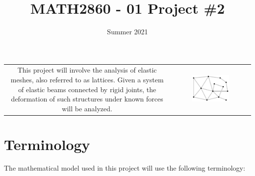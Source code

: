 \documentclass{article}
\title{MATH2860 - 01 Project \#2}
\date{Summer 2021}
\begin{document}
\maketitle

\begin{center}
\begin{tabular}{cc}
\parbox{0.5\textwidth}{
This project will involve the analysis of elastic meshes, also referred to as lattices. Given a system of elastic beams connected by rigid joints, the deformation of such structures under known forces will be analyzed. 
} & \parbox{0.5\textwidth}{
\includegraphics[width = 0.5\textwidth]{elastic_mesh_example}
}
\end{tabular}
\end{center}



\section{Terminology}

The mathematical model used in this project will use the following terminology:
\end{document}
